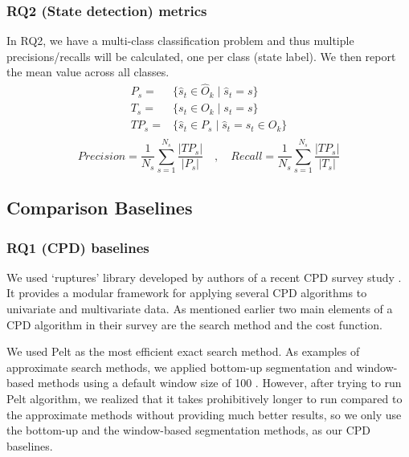 \subsubsection{RQ2 (State detection) metrics}
In RQ2, we have a multi-class classification problem and thus multiple precisions/recalls will be calculated, one per class (state label). We then report the mean value across all classes. 
\begin{equation}
\begin{split}
P_s ={}&{}\big\{\hat{s}_t \in \hat{O}_k \;\big|\; \hat{s}_t = s\big\} \\
T_s ={}&{}\big\{s_t \in O_k \;\big|\; s_t = s\big\} \\
TP_s ={}&{}\big\{\hat{s}_t \in P_s \;\big|\; \hat{s}_t = s_t \in O_k\big\} \\
\end{split}
\end{equation}
$$Precision =\frac{1}{N_s}\sum_{s=1}^{N_s} \frac{|TP_s|}{|P_s|} \quad,\quad Recall = \frac{1}{N_s}\sum_{s=1}^{N_s} \frac{|TP_s|}{|T_s|}$$

\subsection{Comparison Baselines} 
\subsubsection{RQ1 (CPD) baselines} \label{sec:CPD_baseline}
We used `ruptures' library developed by authors of a recent CPD survey study \cite{Truong2018ChangePointSurvey}. It provides a modular framework for applying several CPD algorithms to univariate and multivariate data. %
As mentioned earlier two main elements of a CPD algorithm in their survey are the search method and the cost function.

We used Pelt \cite{killick2012optimal} as the most efficient exact search method. As examples of approximate search methods, we applied bottom-up segmentation and window-based methods using a default window size of 100 \cite{keogh2001online}.
However, after trying to run Pelt algorithm, we realized that it takes prohibitively longer to run compared to the approximate methods without providing much better results, so we only use the bottom-up and the window-based segmentation methods, as our CPD baselines.

